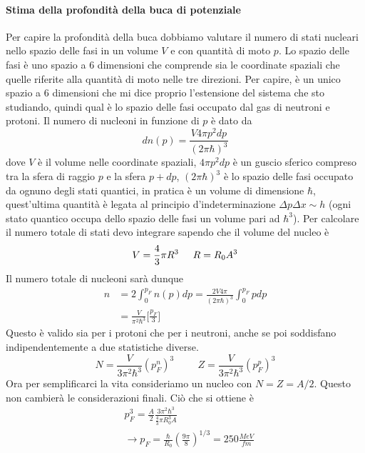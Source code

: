 \paragraph{Stima della profondità della buca di potenziale} Per capire la profondità della buca dobbiamo valutare il numero di stati nucleari nello spazio delle fasi in un volume $V$ e con quantità di moto $p$.
Lo spazio delle fasi è uno spazio a 6 dimensioni che comprende sia le coordinate spaziali che quelle riferite alla quantità di moto nelle tre direzioni. 
Per capire, è un unico spazio a 6 dimensioni che mi dice proprio l'estensione del sistema che sto studiando, quindi qual è lo spazio delle fasi occupato dal gas di neutroni e protoni.
Il numero di nucleoni in funzione di $p$ è dato da
\begin{equation}
dn(p)=\frac{V4\pi p^2 dp}{(2\pi\hbar)^3}
\end{equation}
dove $V$ è il volume nelle coordinate spaziali, $4\pi p^2dp$ è un guscio sferico compreso tra la sfera di raggio $p$ e la sfera $p+dp$, $(2\pi \hbar)^3$ è lo spazio delle fasi occupato da ognuno degli stati quantici, in pratica è un volume di dimensione $\hbar$, quest'ultima quantità è legata al principio d'indeterminazione $\Delta p\Delta x \sim h$ (ogni stato quantico occupa dello spazio delle fasi un volume pari ad $\hbar^3$).
Per calcolare il numero totale di stati devo integrare sapendo che il volume del nucleo è
\[
V=\frac{4}{3}\pi R^3\hspace{0.5cm}R=R_0A^{\/3}
\]
Il numero totale di nucleoni sarà dunque
\begin{equation}
\begin{split}
n &=2\int^{p_F}_0 n(p) dp=\frac{2V4\pi}{(2\pi \hbar)^3}\int_0^{p_F}pdp\\
&=\frac{V}{\pi^2\hbar^3}\biggl[\frac{p_F}{3}\biggl]
\end{split}
\end{equation}
Questo è valido sia per i protoni che per i neutroni, anche se poi soddisfano indipendentemente a due statistiche diverse.
\begin{equation}
N=\frac{V}{3\pi^2\hbar^3}(p^n_F)^3\hspace{1cm}Z=\frac{V}{3\pi^2\hbar^3}(p^p_F)^3
\end{equation}
Ora per semplificarci la vita consideriamo un nucleo con $N=Z=A/2$.
Questo non cambierà le considerazioni finali.
Ciò che si ottiene è
\begin{equation}
\begin{split}
&p_F^3=\frac{A}{2}\frac{3\pi^2\hbar^3}{\frac{4}{3}\pi R_0^3A}\\
&\to p_F=\frac{\hbar}{R_0}\left(\frac{9\pi}{8}\right)^{1/3}=250\frac{MeV}{fm}
\end{split}
\end{equation}
